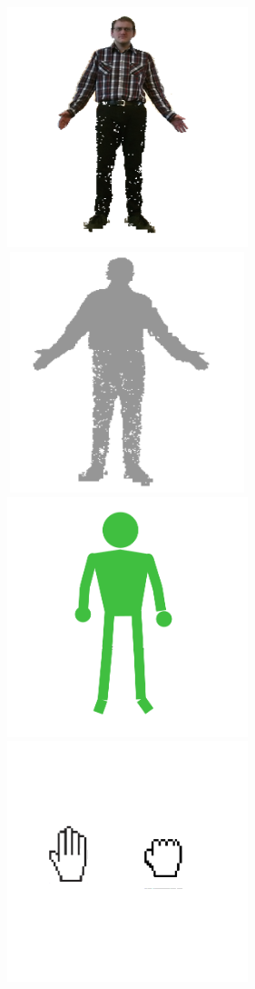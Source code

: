  \begin{figure}[H]
 	\begin{center}
 		\includegraphics[width=7cm, height=7cm]{figures/real_image_example.png}
 		\includegraphics[width=7cm, height=7cm]{figures/schadow_example.png}
 		\includegraphics[width=7cm, height=7cm]{figures/puppet_example.png}
 		\includegraphics[width=7cm, height=7cm]{figures/hand_example.png}

\end{center}
\end{figure}
